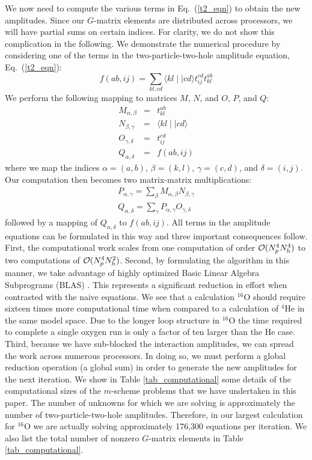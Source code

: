 \documentclass[aps,prc,twocolumn,floatfix]{revtex4}
\begin{document}
We now need to compute the various terms in Eq.~(\ref{t2_eqn}) to obtain
the new amplitudes. Since our $G$-matrix elements are distributed across
processors, we will have partial sums on certain indices. For clarity,
we do not show this complication in the following. 
We demonstrate the numerical procedure by considering one of the terms
in the two-particle-two-hole amplitude equation, Eq.~(\ref{t2_eqn}):
\begin{equation}
f(ab,ij)= \sum_{kl,cd} \langle kl \mid \mid cd \rangle t^{cd}_{ij}t^{ab}_{kl}
\end{equation}
We perform the following mapping to matrices $M$, $N$, and $O$, $P$, and $Q$:
\begin{eqnarray}
M_{\alpha,\beta} &=& t^{ab}_{kl} \nonumber \\
N_{\beta,\gamma} &=& \langle k l \mid\mid cd \rangle \nonumber \\
O_{\gamma,\delta}&=& t^{cd}_{ij}  \nonumber \\
Q_{\alpha,\delta}&=& f(ab,ij)
\end{eqnarray}
where we map the indices $\alpha=(a,b)$, $\beta=(k,l)$, $\gamma=(c,d)$, and
$\delta=(i,j)$. Our computation then becomes two matrix-matrix multiplications:
\begin{eqnarray}
P_{\alpha,\gamma}=\sum_{\beta}  M_{\alpha,\beta} N_{\beta,\gamma} \nonumber \\
Q_{\alpha,\delta}=\sum_{\gamma} P_{\alpha,\gamma}O_{\gamma,\delta}
\end{eqnarray}
followed by a mapping of $Q_{\alpha,\delta}$ to $f(ab,ij)$. 
All terms in the amplitude equations can be formulated
in this way and three important consequences follow. 
First, the computational work 
scales from one computation of order ${\cal O}(N_p^4 N_h^4)$ to two computations
of ${\cal O}(N_p^4 N_h^2)$. Second, by formulating the algorithm in this 
manner, we take advantage of highly optimized Basic Linear Algebra 
Subprograms (BLAS) \cite{blas}.  
This represents a significant reduction in effort when
contrasted with the naive equations. We see that a calculation $^{16}$O 
should require sixteen times more computational time when compared to a
calculation of $^{4}$He in the same model space. Due to the longer loop
structure in $^{16}$O the time required to complete a single oxygen run is
only a factor of ten larger than the He case. 
Third, because we have sub-blocked the interaction amplitudes, we 
can spread the work across numerous processors. In doing so, we must 
perform a global reduction operation (a global sum) in order to 
generate the new amplitudes for the next iteration. 
We show in Table \ref{tab_computational}
some details of the computational sizes of the $m$-scheme problems 
that we have undertaken in this paper. The number of unknowns for
which we are solving is approximately the number of two-particle-two-hole
amplitudes. Therefore, in our largest calculation for $^{16}$O we 
are actually solving approximately 176,300 equations per iteration. 
We also list the total number of nonzero $G$-matrix elements in Table 
\ref{tab_computational}.
\end{document}
